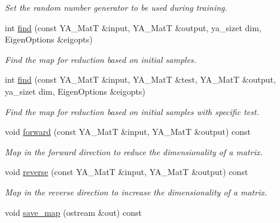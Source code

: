 \begin{CompactItemize}
\begin{CompactList}\small\item\em Set the random number generator to be used during training. \item\end{CompactList}\item 
int \hyperlink{class_y_a_a_t_e_reduce_a5}{find} (const YA\_\-Mat\-T \&input, YA\_\-Mat\-T \&output, ya\_\-sizet dim, Eigen\-Options \&eigopts)
\begin{CompactList}\small\item\em Find the map for reduction based on initial samples. \item\end{CompactList}\item 
int \hyperlink{class_y_a_a_t_e_reduce_a6}{find} (const YA\_\-Mat\-T \&input, YA\_\-Mat\-T \&test, YA\_\-Mat\-T \&output, ya\_\-sizet dim, Eigen\-Options \&eigopts)
\begin{CompactList}\small\item\em Find the map for reduction based on initial samples with specific test. \item\end{CompactList}\item 
\hypertarget{class_y_a_a_t_e_reduce_a7}{
void \hyperlink{class_y_a_a_t_e_reduce_a7}{forward} (const YA\_\-Mat\-T \&input, YA\_\-Mat\-T \&output) const }
\label{class_y_a_a_t_e_reduce_a7}

\begin{CompactList}\small\item\em Map in the forward direction to reduce the dimensionality of a matrix. \item\end{CompactList}\item 
\hypertarget{class_y_a_a_t_e_reduce_a8}{
void \hyperlink{class_y_a_a_t_e_reduce_a8}{reverse} (const YA\_\-Mat\-T \&input, YA\_\-Mat\-T \&output) const }
\label{class_y_a_a_t_e_reduce_a8}

\begin{CompactList}\small\item\em Map in the reverse direction to increase the dimensionality of a matrix. \item\end{CompactList}\item 
\hypertarget{class_y_a_a_t_e_reduce_a9}{
void \hyperlink{class_y_a_a_t_e_reduce_a9}{save\_\-map} (ostream \&out) const }
\label{class_y_a_a_t_e_reduce_a9}


\end{CompactItemize}
